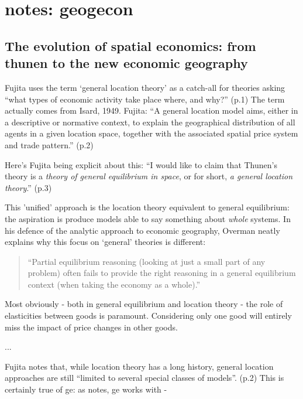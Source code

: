\section{notes: geogecon \label{notes_ge}}

\subsection{The evolution of spatial economics: from thunen to the new economic geography}
\cite{fujita_evolution_2010}

Fujita uses the term `general location theory' as a catch-all for theories asking ``what types of economic activity take place where, and why?'' (p.1) The term actually comes from Isard, 1949. Fujita: ``A general location model aims, either in a descriptive or normative context, to explain the geographical distribution of all agents in a given location space, together with the associated spatial price system and trade pattern.'' (p.2)

Here's Fujita being explicit about this: ``I would like to claim that Thunen's theory is a \emph{theory of general equilibrium in space}, or for short, \emph{a general location theory}.'' (p.3)

This 'unified' approach is the location theory equivalent to general equilibrium: the aspiration is produce models able to say something about \emph{whole} systems. In his defence of the analytic approach to \gls{economic geography}, Overman neatly explains why this focus on `general' theories is different:

\begin{quote}
``Partial equilibrium reasoning (looking at just a small part of any problem) often fails to provide the right reasoning in a general equilibrium context (when taking the economy as a whole).''  
\end{quote}

Most obviously - both in general equilibrium and location theory - the role of elasticities between goods is paramount. Considering only one good will entirely miss the impact of price changes in other goods. 

...

Fujita notes that, while location theory has a long history, general location approaches are still ``limited to several special classes of models''. (p.2) This is certainly true of \gls{ge}: as \citeauthor{fujita_spatial_2001} notes, \gls{ge} works with -

